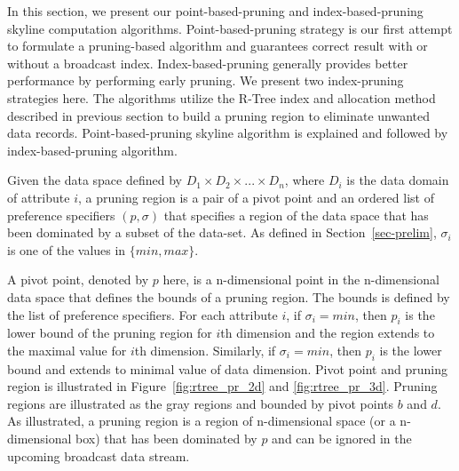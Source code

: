 
In this section, we present our point-based-pruning and index-based-pruning
skyline computation algorithms. Point-based-pruning strategy is
our first attempt to formulate a pruning-based algorithm and guarantees
correct result with or without a broadcast index.
Index-based-pruning generally provides better performance by performing
early pruning. We present two index-pruning strategies here.
The algorithms utilize the R-Tree index and allocation
method described in previous section to build a pruning region to
eliminate unwanted data records. Point-based-pruning skyline algorithm
is explained and followed by index-based-pruning algorithm.


\begin{definition}
Given the data space defined by $D_1 \times D_2 \times ... \times D_n$,
where $D_i$ is the data domain of attribute $i$,
a pruning region is a pair of a pivot point and an ordered list of
preference specifiers $(p, \sigma)$ that specifies a region of the data
space that has been dominated by a subset of the data-set. As
defined in Section~\ref{sec-prelim}, $\sigma_i$ is one of the values in
$\{min, max\}$.
\end{definition}

A pivot point, denoted by $p$ here, is a n-dimensional point in the
n-dimensional data space that defines the bounds of a pruning region.
The bounds is defined by the list of preference specifiers. For each
attribute $i$, if $\sigma_i = min$, then $p_i$ is the lower bound
of the pruning region for $i$th dimension and the region extends to
the maximal value for $i$th dimension. Similarly, if $\sigma_i = min$,
then $p_i$ is the lower bound and extends to minimal value of data
dimension. Pivot point and pruning region is illustrated in
Figure~\ref{fig:rtree_pr_2d} and \ref{fig:rtree_pr_3d}. Pruning regions
are illustrated as the gray regions and bounded by pivot points $b$ and
$d$. As illustrated, a pruning region is a region of n-dimensional
space (or a n-dimensional box) that has been dominated by $p$ and can be
ignored in the upcoming broadcast data stream.

